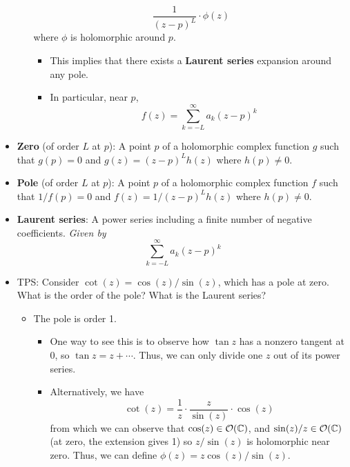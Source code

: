 \documentclass[../notes.tex]{subfiles}
\begin{document}
\begin{itemize}
\begin{itemize}
        \begin{equation*}
            \frac{1}{(z-p)^L}\cdot\phi(z)
        \end{equation*}
        where $\phi$ is holomorphic around $p$.
        \begin{itemize}
            \item This implies that there exists a \textbf{Laurent series} expansion around any pole.
            \item In particular, near $p$,
            \begin{equation*}
                f(z) = \sum_{k=-L}^\infty a_k(z-p)^k
            \end{equation*}
        \end{itemize}
    \end{itemize}
    \item \textbf{Zero} (of order $L$ at $p$): A point $p$ of a holomorphic complex function $g$ such that $g(p)=0$ and $g(z)=(z-p)^Lh(z)$ where $h(p)\neq 0$.
    \item \textbf{Pole} (of order $L$ at $p$): A point $p$ of a holomorphic complex function $f$ such that $1/f(p)=0$ and $f(z)=1/(z-p)^Lh(z)$ where $h(p)\neq 0$.
    \item \textbf{Laurent series}: A power series including a finite number of negative coefficients. \emph{Given by}
    \begin{equation*}
        \sum_{k=-L}^\infty a_k(z-p)^k
    \end{equation*}
    \item TPS: Consider $\cot(z)=\cos(z)/\sin(z)$, which has a pole at zero. What is the order of the pole? What is the Laurent series?
    \begin{itemize}
        \item The pole is order 1.
        \begin{itemize}
            \item One way to see this is to observe how $\tan z$ has a nonzero tangent at 0, so $\tan z=z+\cdots$. Thus, we can only divide one $z$ out of its power series.
            \item Alternatively, we have
            \begin{equation*}
                \cot(z) = \frac{1}{z}\cdot\frac{z}{\sin(z)}\cdot\cos(z)
            \end{equation*}
            from which we can observe that $\cos(z)\in\mathcal{O}(\mathbb{C})$, and $\sin(z)/z\in\mathcal{O}(\mathbb{C})$ (at zero, the extension gives 1) so $z/\sin(z)$ is holomorphic near zero. Thus, we can define $\phi(z)=z\cos(z)/\sin(z)$.

\end{itemize}
\end{itemize}
\end{itemize}
\end{document}
